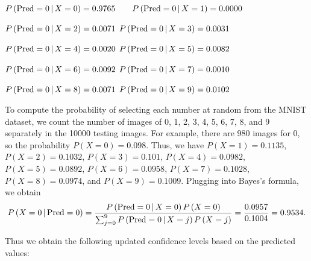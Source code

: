 \documentclass{article}
\begin{document}
$P\left({\rm Pred}=0\,|\,X=0\right)=0.9765 \qquad P\left({\rm Pred}=0\,|\,X=1\right)=0.0000$

$P\left({\rm Pred}=0\,|\,X=2\right)=0.0071$ \qquad $P\left({\rm Pred}=0\,|\,X=3\right)=0.0031$

$P\left({\rm Pred}=0\,|\,X=4\right)=0.0020$ \qquad $P\left({\rm Pred}=0\,|\,X=5\right)=0.0082$

$P\left({\rm Pred}=0\,|\,X=6\right)=0.0092$ \qquad $P\left({\rm Pred}=0\,|\,X=7\right)=0.0010$

$P\left({\rm Pred}=0\,|\,X=8\right)=0.0071$ \qquad $P\left({\rm Pred}=0\,|\,X=9\right)=0.0102$
\medskip

To compute the probability of selecting each number at random from the MNIST dataset, we count the number of images of 0, 1, 2, 3, 4, 5, 6, 7, 8, and 9 separately in the 10000 testing images. For example, there are 980 images for 0, so the probability  $P\left(X=0\right)=0.098$. Thus, we have $P\left(X=1\right)=0.1135$,
$P\left(X=2\right)=0.1032$, $P\left(X=3\right)=0.101$, $P\left(X=4\right)=0.0982$, $P\left(X=5\right)=0.0892$,
$P\left(X=6\right)=0.0958$, $P\left(X=7\right)=0.1028$, $P\left(X=8\right)=0.0974$, and $P\left(X=9\right)=0.1009$.  Plugging into Bayes's formula, we obtain
$$
P\left(X=0\,|\, {\rm Pred}=0\right)=\frac{P\left({\rm Pred}=0\,|\, X=0\right)P\left(X=0\right)}{\sum_{j=0}^9P\left({\rm Pred}=0\,|\,X=j\right)P\left(X=j\right)}
=\frac{0.0957}{0.1004}=0.9534.
$$

Thus we obtain the following updated confidence levels based on the predicted values:
\end{document}
